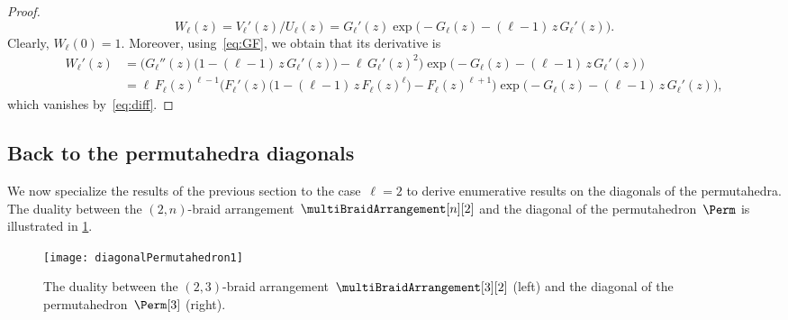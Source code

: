 \begin{proof}
\[
W_\ell(z) = V_\ell'(z) / U_\ell(z) = G_\ell'(z) \exp \big( \! - G_\ell(z) - (\ell-1) \, z \, G_\ell'(z) \big).
\]
Clearly, $W_\ell(0) = 1$.
Moreover, using~\eqref{eq:GF}, we obtain that its derivative is
\begin{align*}
W_\ell'(z)
& = \Big( G_\ell''(z) \big(1 - (\ell-1) \, z \, G_\ell'(z) \big) - \ell \, G_\ell'(z)^2 \Big) \exp \big( \! - G_\ell(z) - (\ell-1) \, z \, G_\ell'(z) \big) \\
& = \ell \, F_\ell(z)^{\ell-1} \Big( F_\ell'(z) \big( 1 - (\ell-1) \, z \, F_\ell(z)^\ell \big) - F_\ell(z)^{\ell+1} \Big) \exp \big( \! - G_\ell(z) - (\ell-1) \, z \, G_\ell'(z) \big),
\end{align*}
which vanishes by~\eqref{eq:diff}.

\end{proof}

\subsection{Back to the permutahedra diagonals} 
\label{subsec:enumerationDiagonal}

We now specialize the results of the previous section to the case~$\ell = 2$ to derive enumerative results on the diagonals of the permutahedra.
The duality between the $(2,n)$-braid arrangement~$\multiBraidArrangement[n][2]$ and the diagonal of the permutahedron~$\Perm$ is illustrated in \cref{fig:diagonalPermutahedron1}.

\begin{figure}
	\texttt{[image: diagonalPermutahedron1]}
	\caption{The duality between the $(2,3)$-braid arrangement~$\multiBraidArrangement[3][2]$ (left) and the diagonal of the permutahedron~$\Perm[3]$ (right).}
	\label{fig:diagonalPermutahedron1}
\end{figure}


